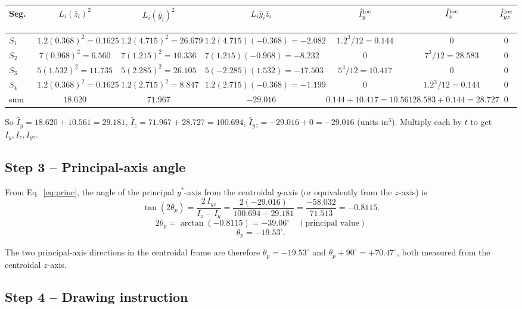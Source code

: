 \documentclass[11pt]{article}
\begin{document}
\begin{tabular}{lcccccc}
\toprule
Seg.\ & $L_i (\bar z_i)^2$ & $L_i(\bar y_i)^2$ & $L_i \bar y_i\bar z_i$ & $\hat I_{y}^{\rm loc}$ & $\hat I_{z}^{\rm loc}$ & $\hat I_{yz}^{\rm loc}$\\
\midrule
$S_1$ & $1.2 (0.368)^2 = 0.1625$ & $1.2(4.715)^2 = 26.679$ & $1.2(4.715)(-0.368) = -2.082$ & $1.2^3/12 = 0.144$ & $0$ & $0$\\
$S_2$ & $7 (0.968)^2 = 6.560$ & $7(1.215)^2 = 10.336$ & $7(1.215)(-0.968) = -8.232$ & $0$ & $7^3/12 = 28.583$ & $0$\\
$S_3$ & $5(1.532)^2 = 11.735$ & $5(2.285)^2 = 26.105$ & $5(-2.285)(1.532) = -17.503$ & $5^3/12 = 10.417$ & $0$ & $0$\\
$S_4$ & $1.2(0.368)^2 = 0.1625$ & $1.2(2.715)^2 = 8.847$ & $1.2(2.715)(-0.368) = -1.199$ & $0$ & $1.2^3/12 = 0.144$ & $0$\\
\midrule
sum   & $\boxed{18.620}$ & $\boxed{71.967}$ & $\boxed{-29.016}$ & $0.144 + 10.417 = 10.561$ & $28.583 + 0.144 = 28.727$ & $0$\\
\bottomrule
\end{tabular}

So $\hat I_y = 18.620 + 10.561 = 29.181$, $\hat I_z = 71.967 + 28.727 = 100.694$, $\hat I_{yz} = -29.016 + 0 = -29.016$ (units in$^3$). Multiply each by $t$ to get $I_y, I_z, I_{yz}$.

\subsection*{Step 3 -- Principal-axis angle}

From Eq.~\eqref{eq:princ}, the angle of the principal $y^\ast$-axis from the centroidal $y$-axis (or equivalently from the $z$-axis) is
$$\tan(2\theta_p) = \frac{2\,I_{yz}}{I_z - I_y} = \frac{2(-29.016)}{100.694 - 29.181} = \frac{-58.032}{71.513} = -0.8115.$$
$$2\theta_p = \arctan(-0.8115) = -39.06^\circ \quad (\text{principal value})$$
$$\theta_p = -19.53^\circ.$$

The two principal-axis directions in the centroidal frame are therefore $\theta_p = -19.53^\circ$ and $\theta_p + 90^\circ = +70.47^\circ$, both measured from the centroidal $z$-axis.

\subsection*{Step 4 -- Drawing instruction}
\end{document}
